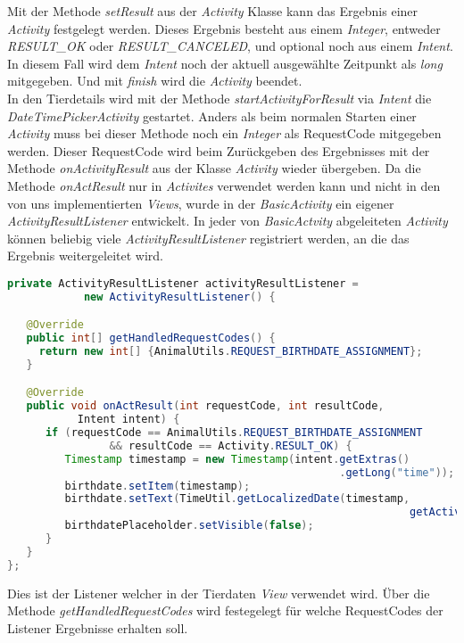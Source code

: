 Mit der Methode \textit{setResult} aus der \textit{Activity} Klasse kann das Ergebnis einer \textit{Activity} festgelegt werden. Dieses Ergebnis besteht aus einem \textit{Integer}, entweder \textit{RESULT\_OK} oder \textit{RESULT\_CANCELED}, und optional noch aus einem \textit{Intent}. In diesem Fall wird dem \textit{Intent} noch der aktuell ausgewählte Zeitpunkt als \textit{long} mitgegeben. Und mit \textit{finish} wird die \textit{Activity} beendet.\\ [1em]
In den Tierdetails wird mit der Methode \textit{startActivityForResult} via \textit{Intent} die \textit{DateTimePickerActivity} gestartet. Anders als beim normalen Starten einer \textit{Activity} muss bei dieser Methode noch ein \textit{Integer} als RequestCode mitgegeben werden. Dieser RequestCode wird beim Zurückgeben des Ergebnisses mit der Methode \textit{onActivityResult} aus der Klasse \textit{Activity} wieder übergeben. Da die Methode \textit{onActResult} nur in \textit{Activites} verwendet werden kann und nicht in den von uns implementierten \textit{Views}, wurde in der \textit{BasicActivity} ein eigener \textit{ActivityResultListener} entwickelt. In jeder von \textit{BasicActvity} abgeleiteten \textit{Activity} können beliebig viele \textit{ActivityResultListener} registriert werden, an die das Ergebnis weitergeleitet wird. 
\begin{lstlisting}[language=java, captionpos=b, caption={Beispiel ActivityResultListener}]
private ActivityResultListener activityResultListener = 
            new ActivityResultListener() {

   @Override
   public int[] getHandledRequestCodes() {
     return new int[] {AnimalUtils.REQUEST_BIRTHDATE_ASSIGNMENT};
   }

   @Override
   public void onActResult(int requestCode, int resultCode, 
           Intent intent) {
      if (requestCode == AnimalUtils.REQUEST_BIRTHDATE_ASSIGNMENT
                && resultCode == Activity.RESULT_OK) {
         Timestamp timestamp = new Timestamp(intent.getExtras()
                                                    .getLong("time"));
         birthdate.setItem(timestamp);
         birthdate.setText(TimeUtil.getLocalizedDate(timestamp, 
                                                               getActivity()));
         birthdatePlaceholder.setVisible(false);
      }
   }
};
\end{lstlisting}
Dies ist der Listener welcher in der Tierdaten \textit{View} verwendet wird. Über die Methode \textit{getHandledRequestCodes} wird festegelegt für welche RequestCodes der Listener Ergebnisse erhalten soll. \\[0.5em]
